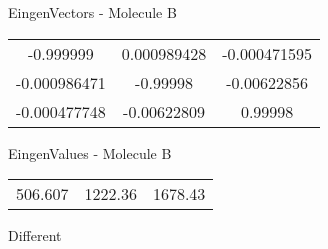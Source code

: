 \begin{multicols}{2}
\begin{center}
\vtab
 EingenVectors - Molecule B     \\
\vtab
\begin{tabular}{|c c c|}
-0.999999	 & 	0.000989428	 & 	-0.000471595	 \\
-0.000986471	 & 	-0.99998	 & 	-0.00622856	 \\
-0.000477748	 & 	-0.00622809	 & 	0.99998
\end{tabular}

\vtab
 EingenValues - Molecule B     \\
\vtab
\begin{tabular}{|c c c|}
506.607	 & 	1222.36	 & 	1678.43	 \\
\end{tabular}

\end{center}
\end{multicols}
\begin{center}
\vtab
\vtab
\textcolor{NavyBlue}{\Large Different}
\end{center}

 \newpage

